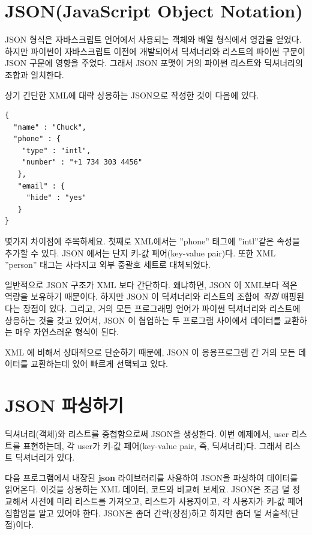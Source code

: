 \section{JSON(JavaScript Object Notation)}

JSON 형식은 자바스크립트 언어에서 사용되는 객체와 배열 형식에서 영감을 얻었다.
하지만 파이썬이 자바스크립트 이전에 개발되어서 딕셔너리와 리스트의 파이썬 구문이 JSON 구문에 영향을 주었다.
그래서 JSON 포맷이 거의 파이썬 리스트와 딕셔너리의 조합과 일치한다. 

상기 간단한 XML에 대략 상응하는 JSON으로 작성한 것이 다음에 있다.

\beforeverb
\begin{verbatim}
{
  "name" : "Chuck",
  "phone" : {
    "type" : "intl",
    "number" : "+1 734 303 4456"
   },
   "email" : {
     "hide" : "yes"
   }
}
\end{verbatim}
\afterverb
%

몇가지 차이점에 주목하세요. 첫째로 XML에서는 ''phone'' 태그에 ''intl''같은 속성을 추가할 수 있다.
JSON 에서는 단지 키-값 페어(key-value pair)다. 
또한 XML ''person'' 태그는 사라지고 외부 중괄호 세트로 대체되었다.

일반적으로 JSON 구조가 XML 보다 간단하다. 
왜냐하면, JSON 이 XML보다 적은 역량을 보유하기 때문이다.
하지만 JSON 이 딕셔너리와 리스트의 조합에 {\em 직접} 매핑된다는 장점이 있다.
그리고, 거의 모든 프로그래밍 언어가 파이썬 딕셔너리와 리스트에 상응하는 것을 갖고 있어서,
JSON 이 협업하는 두 프로그램 사이에서 데이터를 교환하는 매우 자연스러운 형식이 된다.

XML 에 비해서 상대적으로 단순하기 때문에, JSON 이 응용프로그램 간 거의 모든 데이터를 교환하는데 있어 빠르게 선택되고 있다. 

\section{JSON 파싱하기}
딕셔너리(객체)와 리스트를 중첩함으로써 JSON을 생성한다. 
이번 예제에서, user 리스트를 표현하는데, 각 user가 키-값 페어(key-value pair, 즉, 딕셔너리)다.
그래서 리스트 딕셔너리가 있다.

다음 프로그램에서 내장된 {\bf json} 라이브러리를 사용하여 JSON을 파싱하여 데이터를 읽어온다.
이것을 상응하는 XML 데이터, 코드와 비교해 보세요. 
JSON은 조금 덜 정교해서 사전에 미리 리스트를 가져오고, 리스트가 사용자이고, 각 사용자가 키-값 페어 집합임을 알고 있어야 한다. 
JSON은 좀더 간략(장점)하고 하지만 좀더 덜 서술적(단점)이다. 

